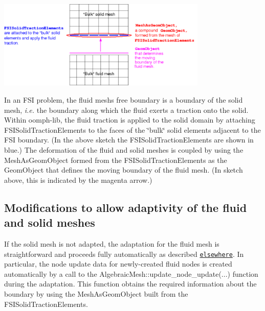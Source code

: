  
\begin{DoxyImage}
\includegraphics[width=0.75\textwidth]{fsi_with_adaptive_wall_basic}
\end{DoxyImage}


In an F\+SI problem, the fluid mesh\textquotesingle{}s free boundary is a boundary of the solid mesh, {\itshape  i.\+e. } the boundary along which the fluid exerts a traction onto the solid. Within {\ttfamily oomph-\/lib}, the fluid traction is applied to the solid domain by attaching {\ttfamily F\+S\+I\+Solid\+Traction\+Elements} to the faces of the \char`\"{}bulk\char`\"{} solid elements adjacent to the F\+SI boundary. (In the above sketch the {\ttfamily F\+S\+I\+Solid\+Traction\+Elements} are shown in blue.) The deformation of the fluid and solid meshes is coupled by using the {\ttfamily Mesh\+As\+Geom\+Object} formed from the {\ttfamily F\+S\+I\+Solid\+Traction\+Elements} as the {\ttfamily Geom\+Object} that defines the moving boundary of the fluid mesh. (In sketch above, this is indicated by the magenta arrow.)\hypertarget{index_modification1}{}\subsection{Modifications to allow adaptivity of the fluid and solid meshes}\label{index_modification1}
If the solid mesh is not adapted, the adaptation for the fluid mesh is straightforward and proceeds fully automatically as described \href{../../../interaction/fsi_collapsible_channel_algebraic/html/index.html}{\tt elsewhere}. In particular, the node update data for newly-\/created fluid nodes is created automatically by a call to the {\ttfamily Algebraic\+Mesh\+::update\+\_\+node\+\_\+update}(...) function during the adaptation. This function obtains the required information about the boundary by using the {\ttfamily Mesh\+As\+Geom\+Object} built from the {\ttfamily F\+S\+I\+Solid\+Traction\+Elements}.

